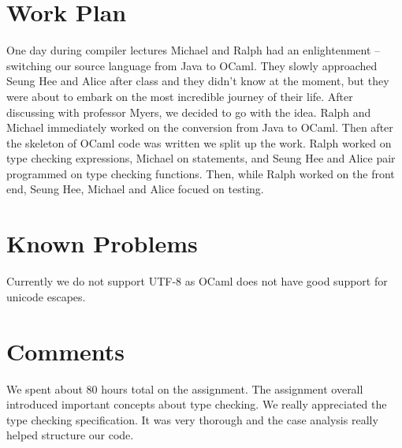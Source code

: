 \documentclass{hw}
\begin{document}
\section{Work Plan}\label{sec:workplan}
One day during compiler lectures Michael and Ralph had an enlightenment -- switching our
source language from Java to OCaml.
They slowly approached Seung Hee and Alice after class and they didn't know at the moment,
but they were about to embark on the most incredible journey of their life. After discussing
with professor Myers, we decided to go with the idea. Ralph and Michael immediately
worked on the conversion from Java to OCaml. Then after the skeleton of OCaml code was written
we split up the work. Ralph worked on type checking expressions, Michael on statements,
and Seung Hee and Alice pair programmed on type checking functions. Then, while
Ralph worked on the front end, Seung Hee, Michael and Alice focued on testing.

\section{Known Problems}\label{sec:problems}
Currently we do not support UTF-8 as OCaml does not have good support for unicode
escapes.

\section{Comments}\label{sec:comments}
We spent about 80 hours total on the assignment. The assignment overall
introduced important concepts about type checking. We really appreciated
the type checking specification. It was very thorough and the case analysis
really helped structure our code.
\end{document}
